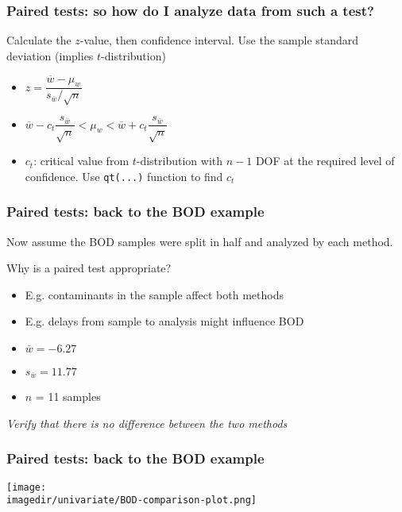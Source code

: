 \begin{frame}\frametitle{Paired tests: so how do I analyze data from such a test?}

	Calculate the $z$-value, then confidence interval. Use the sample standard deviation (implies $t$-distribution)
	\begin{itemize}
		\item	$z = \dfrac{\overline{w} - \mu_w}{s_{\overline{w}} / \sqrt{n}}$
	\end{itemize}
	\begin{itemize}
		\item	$\overline{w} - c_t \dfrac{s_{\overline{w}}}{\sqrt{n}} < \mu_w < \overline{w} + c_t \dfrac{s_{\overline{w}}}{\sqrt{n}}$
	\end{itemize}
	\begin{itemize}
		\item	$c_t$: critical value from $t$-distribution with $n-1$ DOF at the required level of confidence. Use \texttt{qt(...)} function to find $c_t$
	\end{itemize}
\end{frame}

\begin{frame}\frametitle{Paired tests: back to the BOD example}

	Now assume the BOD samples were split in half and analyzed by each method.

	Why is a paired test appropriate?
	\begin{itemize}
		\item	E.g. contaminants in the sample affect both methods
		\item	E.g. delays from sample to analysis might influence BOD
	\end{itemize}
	\begin{itemize}
		\item	$\overline{w} = -6.27$
		\item	$s_{\overline{w}} = 11.77$
		\item	$n$ = 11 samples
	\end{itemize}

	\emph{Verify that there is no difference between the two methods}
\end{frame}

\begin{frame}\frametitle{Paired tests: back to the BOD example}
	\begin{center}
		\texttt{[image: \\imagedir/univariate/BOD-comparison-plot.png]}
	\end{center}
\end{frame}

